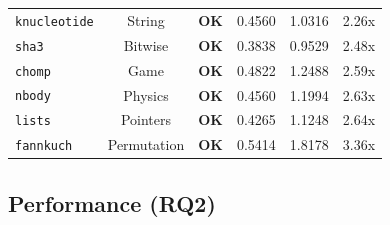 \documentclass{llncs} %
\begin{document}
\begin{center}
{\begin{tabular}{|l|c|c|c|c|r|}
\texttt{knucleotide} & String        & \textbf{OK} & 0.4560 & 1.0316 & 2.26x \\
\texttt{sha3}        & Bitwise       & \textbf{OK} & 0.3838 & 0.9529 & 2.48x \\
\texttt{chomp}       & Game          & \textbf{OK} & 0.4822 & 1.2488 & 2.59x \\
\texttt{nbody}       & Physics       & \textbf{OK} & 0.4560 & 1.1994 & 2.63x \\
\texttt{lists}       & Pointers      & \textbf{OK} & 0.4265 & 1.1248 & 2.64x \\
\texttt{fannkuch}    & Permutation   & \textbf{OK} & 0.5414 & 1.8178 & 3.36x \\
\hline
\end{tabular}%
}
\end{center}

\subsection{Performance (RQ2)}
\end{document}

